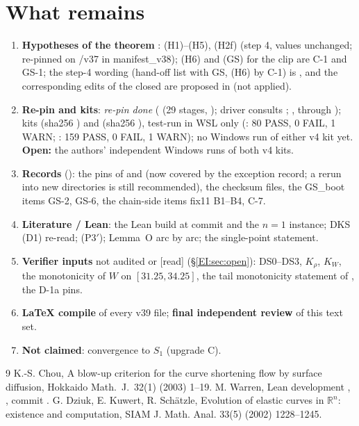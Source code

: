 \documentclass[11pt]{article}
\begin{document}
\section{What remains}\label{M:sec:remains}
\begin{enumerate}[leftmargin=*]
\item \textbf{Hypotheses of the theorem} \tH: (H1)--(H5), (H2f) (step 4, values unchanged; re-pinned on /v37 in manifest\_v38); (H6) and (GS) for the clip are C-1 and GS-1; the step-4 wording (hand-off list with GS, (H6) by C-1) is , and the corresponding edits of the closed  are proposed in  (not applied).
\item \textbf{Re-pin and kits}: \emph{re-pin done} ( (29 stages, ); driver  consults ; ,  through ); kits  (sha256 ) and  (sha256 ), test-run in WSL only (: 80 PASS, 0 FAIL, 1 WARN; : 159 PASS, 0 FAIL, 1 WARN); no Windows run of either v4 kit yet. \textbf{Open:} the authors' independent Windows runs of both v4 kits.
\item \textbf{Records} (): the pins of  and  (now covered by the exception record; a rerun into new directories is still recommended), the checksum files, the GS\_boot items GS-2, GS-6, the chain-side items fix11 B1--B4, C-7.
\item \textbf{Literature / Lean}: the Lean build at commit  and the $n=1$ instance; DKS (D1) re-read; (P3$'$); Lemma~O arc by arc; the single-point statement.
\item \textbf{Verifier inputs} not audited or [read] (\S\ref{EI:sec:open}): DS0--DS3, $K_\rho$, $K_W$, the monotonicity of $W$ on $[31.25,34.25]$, the tail monotonicity statement of , the D-1a pins.
\item \textbf{LaTeX compile} of every v39 file; \textbf{final independent review} of this text set.
\item \textbf{Not claimed}: convergence to $S_1$ (upgrade C).
\end{enumerate}

\begin{thebibliography}{9}
 K.-S. Chou, A blow-up criterion for the curve shortening flow by surface diffusion, Hokkaido Math.\ J.\ 32(1) (2003) 1--19.
 M. Warren, Lean development , , commit .
 G. Dziuk, E. Kuwert, R. Sch{\"a}tzle, Evolution of elastic curves in $\mathbb R^n$: existence and computation, SIAM J. Math. Anal. 33(5) (2002) 1228--1245.
\end{thebibliography}
\end{document}

